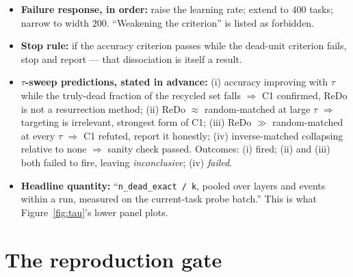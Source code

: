 \documentclass[10pt]{article}
\begin{document}
\begin{itemize}
\item \textbf{Failure response, in order:} raise the learning rate; extend to
$400$ tasks; narrow to width $200$. ``Weakening the criterion'' is listed as
forbidden.

\item \textbf{Stop rule:} if the accuracy criterion passes while the dead-unit
criterion fails, stop and report --- that dissociation is itself a result.

\item \textbf{$\tau$-sweep predictions, stated in advance:} (i) accuracy
improving with $\tau$ while the truly-dead fraction of the recycled set falls
$\Rightarrow$ C1 confirmed, ReDo is not a resurrection method; (ii) ReDo
$\approx$ random-matched at large $\tau$ $\Rightarrow$ targeting is irrelevant,
strongest form of C1; (iii) ReDo $\gg$ random-matched at every $\tau$
$\Rightarrow$ C1 refuted, report it honestly; (iv) inverse-matched collapsing
relative to none $\Rightarrow$ sanity check passed. Outcomes: (i) fired; (ii)
and (iii) both failed to fire, leaving \emph{inconclusive}; (iv) \emph{failed}.

\item \textbf{Headline quantity:} ``\texttt{n\_dead\_exact / k}, pooled over
layers and events within a run, measured on the current-task probe batch.'' This
is what Figure~\ref{fig:tau}'s lower panel plots.
\end{itemize}

\section{The reproduction gate}
\label{app:gate}
\end{document}
